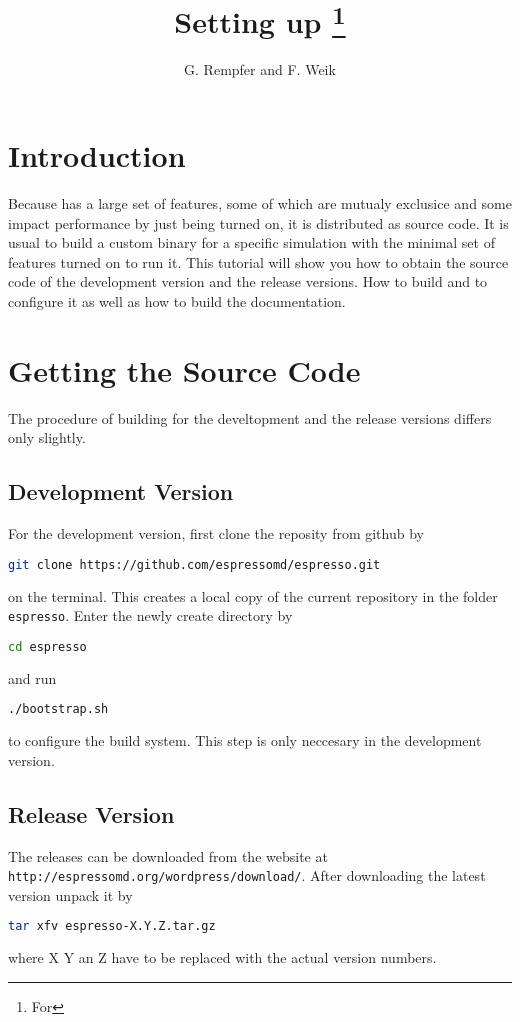 \documentclass[
paper=a4,                       %
fontsize=11pt,                  %
headinclude=false,              %
footinclude=false,              %
pagesize,                       %
]{scrartcl}
\begin{document}
\esptitlehead

\title{Setting up \es{}
\ifdefined\esversion%
\thanks{For \es \esversion}%
\fi%
}
\author{G. Rempfer and F. Weik}

\maketitle

\section{Introduction}
Because \es{} has a large set of features, some of which are mutualy exclusice and some impact performance by just being turned on, it is distributed as source code. It is usual to build a custom \es{} binary for a specific simulation with the minimal set of features turned on to run it. This tutorial will show you how to obtain the source code of the development version and the release versions. How to build and to configure it as well as how to build the documentation.

\section{Getting the Source Code}
The procedure of building \es{} for the develtopment and the release versions differs only slightly.
\subsection{Development Version}
%
For the development version, first clone the \es{} reposity from github by
\begin{lstlisting}[language=bash]
git clone https://github.com/espressomd/espresso.git
\end{lstlisting}
%
on the terminal. This creates a local copy of the current \es{} repository in the folder \verb!espresso!.
Enter the newly create directory by
\begin{lstlisting}[language=bash]
cd espresso
\end{lstlisting}
and run
\begin{lstlisting}[language=bash]
./bootstrap.sh
\end{lstlisting}
to configure the build system. This step is only neccesary in the development version.

\subsection{Release Version}
The \es{} releases can be downloaded from the \es{} website at \verb!http://espressomd.org/wordpress/download/!.
After downloading the latest version unpack it by
\begin{lstlisting}[language=bash]
  tar xfv espresso-X.Y.Z.tar.gz
\end{lstlisting}
where X Y an Z have to be replaced with the actual version numbers.
\end{document}
